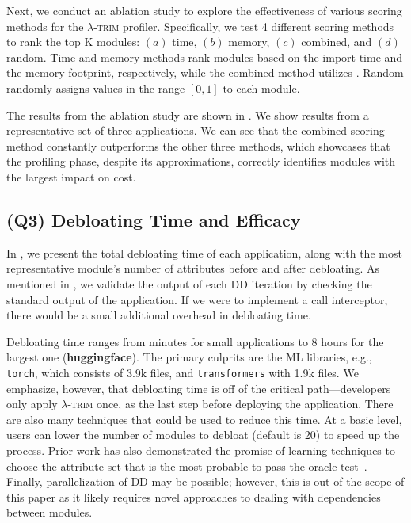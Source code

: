 \documentclass[sigplan,nonacm]{acmart}
\newcommand{\sys}{\textsc{\ensuremath{\lambda}-trim}\xspace}
\newcommand{\application}[1]{{\textcolor{pennblue}{\textbf{#1}}}}
\newcommand{\module}[1]{{\texttt{#1}}}
\begin{document}
Next, we conduct an ablation study to explore the effectiveness of various scoring methods for the \sys profiler.
Specifically, we test 4 different scoring methods to rank the top K modules: $(a)$ time, $(b)$ memory, $(c)$ combined, and $(d)$ random.
Time and memory methods rank modules based on the import time and the memory footprint, respectively, while the combined method utilizes .
Random randomly assigns values in the range $[0,1]$ to each module.


The results from the ablation study are shown in .
We show results from a representative set of three applications.
We can see that the combined scoring method constantly outperforms the other three methods, which showcases that the profiling phase, despite its approximations, correctly identifies modules with the largest impact on cost.


%
 



%
 
\subsection{(Q3) Debloating Time and Efficacy}



In , we present the total debloating time of each application, along with the most representative module's number of attributes before and after debloating.
As mentioned in , we validate the output of each DD iteration by checking the standard output of the application.
If we were to implement a call interceptor, there would be a small additional overhead in debloating time.

Debloating time ranges from minutes for small applications to 8 hours for the largest one (\application{huggingface}).
The primary culprits are the ML libraries, e.g., \module{torch}, which consists of 3.9k files, and \module{transformers} with 1.9k files.
We emphasize, however, that debloating time is off of the critical path---developers only apply \sys once, as the last step before deploying the application.
There are also many techniques that could be used to reduce this time.
At a basic level, users can lower the number of modules to debloat (default is 20) to speed up the process.
Prior work has also demonstrated the promise of learning techniques to choose the attribute set that is the most probable to pass the oracle test~\cite{deltarl2018}.
Finally, parallelization of DD may be possible; however, this is out of the scope of this paper as it likely requires novel approaches to dealing with dependencies between modules.
\end{document}
